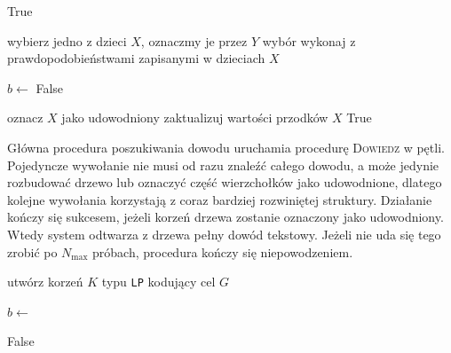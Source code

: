 \documentclass[shortabstract]{iithesis}
\theoremstyle{definition}
\theoremstyle{remark}
\theoremstyle{plain}
\begin{document}
\begin{algorithm}[H]
\caption{Przeszukiwanie drzewa dowodu}
\label{alg:try-node}
\begin{algorithmic}[1]
        \State \Return True
    \EndIf

        \State \Return {}
    \EndIf

        \State wybierz jedno z dzieci $X$, oznaczmy je przez $Y$
        \State wybór wykonaj z prawdopodobieństwami zapisanymi w dzieciach $X$
        \State \Return {}
    \EndIf

            \State $b \gets$ 
                \State \Return False
            \EndIf
        \EndFor

        \State oznacz $X$ jako udowodniony
        \State zaktualizuj wartości przodków $X$
        \State \Return True
    \EndIf
\EndProcedure
\end{algorithmic}
\end{algorithm}

Główna procedura poszukiwania dowodu uruchamia procedurę \textsc{Dowiedz}
w pętli. Pojedyncze wywołanie nie musi od razu znaleźć całego dowodu, a może jedynie rozbudować drzewo lub oznaczyć część
wierzchołków jako udowodnione, dlatego kolejne wywołania korzystają z coraz bardziej
rozwiniętej struktury. Działanie kończy się sukcesem, jeżeli korzeń drzewa zostanie
oznaczony jako udowodniony. Wtedy system odtwarza z drzewa pełny dowód tekstowy.
Jeżeli nie uda się tego zrobić po \(N_{\max}\) próbach, procedura kończy się
niepowodzeniem.

\begin{algorithm}[H]
\caption{Główna pętla poszukiwania dowodu}
\label{alg:main-proof-loop}
\begin{algorithmic}[1]
    \State utwórz korzeń $K$ typu \texttt{LP} kodujący cel $G$

            \State \Return {}
        \EndIf

        \State $b \gets$ 

            \State \Return {}
        \EndIf
    \EndFor

    \State \Return False
\EndProcedure
\end{algorithmic}
\end{algorithm}
\end{document}
